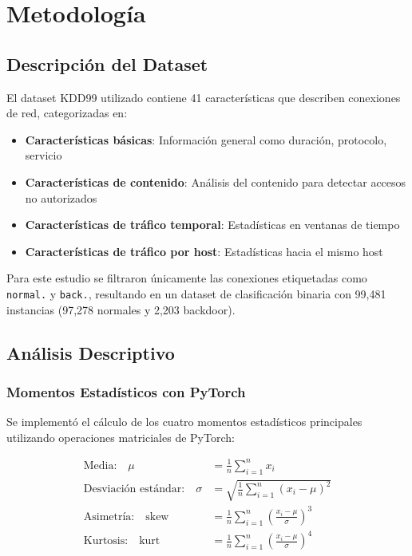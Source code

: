 \documentclass[12pt,a4paper]{article}
\begin{document}
\section{Metodología}

\subsection{Descripción del Dataset}

El dataset KDD99 utilizado contiene 41 características que describen conexiones de red, categorizadas en:

\begin{itemize}
    \item \textbf{Características básicas}: Información general como duración, protocolo, servicio
    \item \textbf{Características de contenido}: Análisis del contenido para detectar accesos no autorizados
    \item \textbf{Características de tráfico temporal}: Estadísticas en ventanas de tiempo
    \item \textbf{Características de tráfico por host}: Estadísticas hacia el mismo host
\end{itemize}

Para este estudio se filtraron únicamente las conexiones etiquetadas como \texttt{normal.} y \texttt{back.}, resultando en un dataset de clasificación binaria con 99,481 instancias (97,278 normales y 2,203 backdoor).

\subsection{Análisis Descriptivo}

\subsubsection{Momentos Estadísticos con PyTorch}

Se implementó el cálculo de los cuatro momentos estadísticos principales utilizando operaciones matriciales de PyTorch:

\begin{align}
\text{Media:} \quad \mu &= \frac{1}{n} \sum_{i=1}^{n} x_i \\
\text{Desviación estándar:} \quad \sigma &= \sqrt{\frac{1}{n} \sum_{i=1}^{n} (x_i - \mu)^2} \\
\text{Asimetría:} \quad \text{skew} &= \frac{1}{n} \sum_{i=1}^{n} \left(\frac{x_i - \mu}{\sigma}\right)^3 \\
\text{Kurtosis:} \quad \text{kurt} &= \frac{1}{n} \sum_{i=1}^{n} \left(\frac{x_i - \mu}{\sigma}\right)^4
\end{align}
\end{document}
